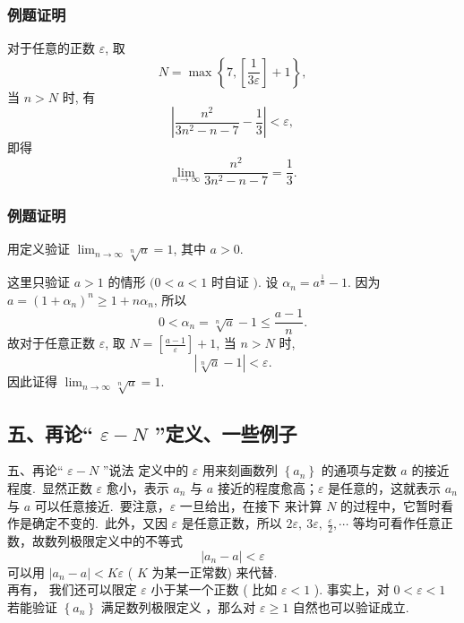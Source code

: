 \documentclass[mathserif]{beamer}
\begin{document}
\begin{frame}{}%
	\frametitle{例题证明}
	\begin{proofs}
	\suojin 对于任意的正数 $\varepsilon$, 取
	$$
	N=\max \left\{7,\left[\frac{1}{3 \varepsilon}\right]+1\right\} , 
	$$
	当 $n>N$ 时, 有
	$$
	\left|\frac{n^2}{3 n^2-n-7}-\frac{1}{3}\right|<\varepsilon,
	$$
	即得
	$$
	\lim _{n \rightarrow \infty} \frac{n^2}{3 n^2-n-7}=\frac{1}{3} .
	$$   
	\end{proofs}
\end{frame}


\begin{frame}{}%
   \frametitle{例题证明}
	\begin{ex}
		\suojin 用定义验证 $\lim _{n \rightarrow \infty} \sqrt[n]{a}=1$, 其中 $a>0$. 
	\end{ex}
\pause
\begin{proofs}
	\suojin 这里只验证 $a>1$ 的情形 $(0<a<1$ 时自证 $)$. 设 $\alpha_n=a^{\frac{1}{n}}-1$. 因为 $a=\left(1+\alpha_n\right)^n \geq 1+n \alpha_n$, 所以
	$$
	0<\alpha_n=\sqrt[n]{a}-1 \leq \frac{a-1}{n} .
	$$
	故对于任意正数 $\varepsilon$, 取 $N=\left[\frac{a-1}{\varepsilon}\right]+1$, 当 $n>N$ 时,
	$$
	|\sqrt[n]{a}-1|<\varepsilon.
	$$
	因此证得 $\lim _{n \rightarrow \infty} \sqrt[n]{a}=1$. 
\end{proofs} 
\end{frame}



\subsection{五、再论“ $\varepsilon-N$ ”定义、一些例子 }
\begin{frame}{  五、再论`` $\varepsilon-N$ ”说法}%
	\suojin {} 定义中的 $\varepsilon$ 用来刻画数列 $\left\{a_n\right\}$ 的通项与定数 $a$ 的接近程度.\ 显然正数 $\varepsilon$ 愈小，表示 $a_n$ 与 $a$ 接近的程度愈高；$\varepsilon$ 是任意的，这就表示 $a_n$ 与 $a$ 可以任意接近.\ 要注意，$\varepsilon$ 一旦给出，在接下 来计算 $N$ 的过程中，它暂时看作是确定不变的.\ 此外，又因 $\varepsilon$ 是任意正数，所以 $2 \varepsilon,\ 3 \varepsilon,\  \frac{\varepsilon}{2}, \cdots$ 等均可看作任意正数，故数列极限定义中的不等式
	$$
	\left|a_n-a\right|<\varepsilon
	$$
	可以用 $\left|a_n-a\right|<K \varepsilon$ ( $K$ 为某一正常数) 来代替. \\
	\suojin 再有， 我们还可以限定 $\varepsilon$ 小于某一个正数 ( 比如 $\varepsilon<1$ ). 事实上，对 $0<\varepsilon<1$ 若能验证 $\left\{a_n\right\}$ 满足数列极限定义 ，那么对 $\varepsilon \geqslant 1$ 自然也可以验证成立.
	
\end{frame}
\end{document}

